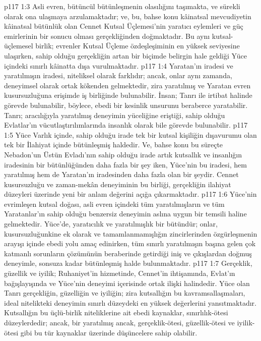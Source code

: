 \vs p117 1:3 Asli evren, bütüncül bütünleşmenin olasılığını taşımakta, ve sürekli olarak ona ulaşmaya arzulamaktadır; ve, bu, bahse konu kâinatsal mevcudiyetin kâinatsal bütünlük olan Cennet Kutsal Üçlemesi’nin yaratıcı eylemleri ve güç emirlerinin bir sonucu olması gerçekliğinden doğmaktadır. Bu aynı kutsal\hyp{}üçlemesel birlik; evrenler Kutsal Üçleme özdeşleşiminin en yüksek seviyesine ulaşırken, sahip olduğu gerçekliğin artan bir biçimde belirgin hale geldiği Yüce içindeki sınırlı kâinatta dışa vurulmaktadır.
\vs p117 1:4 Yaratan’ın iradesi ve yaratılmışın iradesi, niteliksel olarak farklıdır; ancak, onlar aynı zamanda, deneyimsel olarak ortak kökenden gelmektedir, zira yaratılmış ve Yaratan evren kusursuzluğuna erişimde iş birliğinde bulunabilir. İnsan; Tanrı ile irtibat halinde görevde bulunabilir, böylece, ebedi bir kesinlik unsurunu beraberce yaratabilir. Tanrı; aracılığıyla yaratılmış deneyimin yüceliğine eriştiği, sahip olduğu Evlatlar’ın vücutlaştırılımlarında insanlık olarak bile görevde bulunabilir.
\vs p117 1:5 Yüce Varlık içinde, sahip olduğu irade tek bir kutsal kişiliğin dışavurumu olan tek bir İlahiyat içinde bütünleşmiş haldedir. Ve, bahse konu bu süreçte Nebadon’un Üstün Evladı’nın sahip olduğu irade artık kutsallık ve insanlığın iradesinin bir bütünlüğünden daha fazla bir şey iken, Yüce’nin bu iradesi, hem yaratılmış hem de Yaratan’ın iradesinden daha fazla olan bir şeydir. Cennet kusursuzluğu ve zaman\hyp{}mekân deneyiminin bu birliği, gerçekliğin ilahiyat düzeyleri üzerinde yeni bir anlam değerini açığa çıkarmaktadır.
\vs p117 1:6 Yüce’nin evrimleşen kutsal doğası, asli evren içindeki tüm yaratılmışların ve tüm Yaratanlar’ın sahip olduğu benzersiz deneyimin aslına uygun bir temsili haline gelmektedir. Yüce’de, yaratıcılık ve yaratılmışlık bir bütündür; onlar, kusursuzluğunkine ek olarak ve tamamlanmamışlığın zincirlerinden özgürleşmenin arayışı içinde ebedi yolu amaç edinirken, tüm sınırlı yaratılmışın başına gelen çok katmanlı sorunların çözümünün beraberinde getirdiği iniş ve çıkışlardan doğmuş deneyimle, sonsuza kadar bütünleşmiş halde bulunmaktadır.
\vs p117 1:7 Gerçeklik, güzellik ve iyilik; Ruhaniyet’in hizmetinde, Cennet’in ihtişamında, Evlat’ın bağışlayışında ve Yüce’nin deneyimi içerisinde ortak ilişki halindedir. Yüce olan Tanrı gerçekliğin, güzelliğin ve iyiliğin; zira kutsallığın bu kavramsallaşmaları, ideal nitelikteki deneyimin sınırlı düzeydeki en yüksek değerlerini yansıtmaktadır. Kutsallığın bu üçlü\hyp{}birlik niteliklerine ait ebedi kaynaklar, sınırlılık\hyp{}ötesi düzeylerdedir; ancak, bir yaratılmış ancak, gerçeklik\hyp{}ötesi, güzellik\hyp{}ötesi ve iyilik\hyp{}ötesi gibi bu tür kaynaklar üzerinde düşüncelere sahip olabilir.
